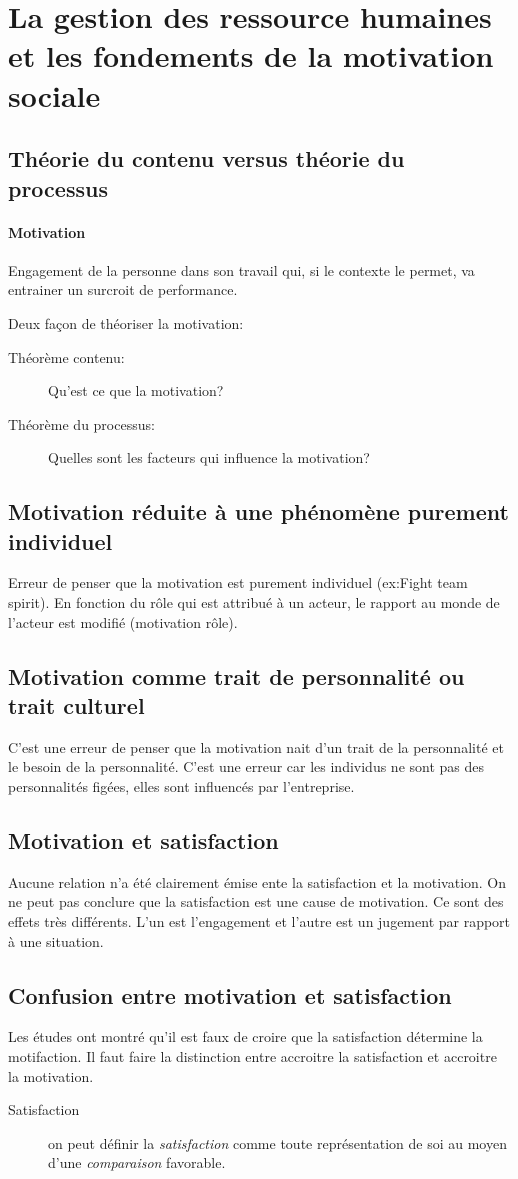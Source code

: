 \documentclass[11pt]{article} %
\begin{document}
\section{La gestion des ressource humaines et les fondements de la motivation sociale}
	\subsection{Théorie du contenu versus théorie du processus}
		\paragraph{Motivation} Engagement de la personne dans son travail qui, si le contexte le permet, va entrainer un surcroit de performance.

		Deux façon de théoriser la motivation:
		\begin{description}
			\item[Théorème contenu: ] Qu'est ce que la motivation?
			\item[Théorème du processus: ] Quelles sont les facteurs qui influence la motivation?
		\end{description}
	\subsection{Motivation réduite à une phénomène purement individuel}
		Erreur de penser que la motivation est purement individuel (ex:Fight team spirit). En fonction du
		rôle qui est attribué à un acteur, le rapport au monde de l'acteur est modifié (motivation rôle).
	\subsection{Motivation comme trait de personnalité ou trait culturel}
		C'est une erreur de penser que la motivation nait d'un trait de la personnalité et le besoin de la 
		personnalité. C'est une erreur car les individus ne sont pas des personnalités figées, elles sont 	
		influencés par l'entreprise.
	\subsection{Motivation et satisfaction}
		Aucune relation n'a été clairement émise ente la satisfaction et la motivation. On ne peut pas conclure 
		que la satisfaction est une cause de motivation. Ce sont des effets très différents. L'un est 
		l'engagement et l'autre est un jugement par rapport à une situation.
	\subsection{Confusion entre motivation et satisfaction}
	Les études ont montré qu'il est faux de croire que la satisfaction détermine la motifaction. Il faut faire la distinction entre accroitre la satisfaction et accroitre la motivation.
	\begin{description}
		\item[Satisfaction] on peut définir la \textit{satisfaction} comme toute représentation de soi au moyen d'une \textit{comparaison} favorable.
	\end{description}
\end{document}

